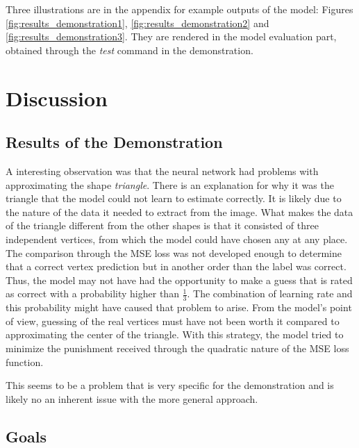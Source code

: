 \documentclass[12pt, a4paper, titlepage]{report}
\begin{document}
Three illustrations are in the appendix for example outputs of the model: Figures \ref{fig:results_demonstration1}, \ref{fig:results_demonstration2} and \ref{fig:results_demonstration3}.
They are rendered in the model evaluation part, obtained through the \emph{test} command in the demonstration.





\chapter{Discussion}

\section{Results of the Demonstration}

A interesting observation was that the neural network had problems with approximating the shape \emph{triangle}.
There is an explanation for why it was the triangle that the model could not learn to estimate correctly. It is likely due to the nature of the data it needed to extract from the image. What makes the data of the triangle different from the other shapes is that it consisted of three independent vertices, from which the model could have chosen any at any place. The comparison through the MSE loss was not developed enough to determine that a correct vertex prediction but in another order than the label was correct. Thus, the model may not have had the opportunity to make a guess that is rated as correct with a probability higher than $\frac{1}{3}$. The combination of learning rate and this probability might have caused that problem to arise. From the model's point of view, guessing of the real vertices must have not been worth it compared to approximating the center of the triangle. With this strategy, the model tried to minimize the punishment received through the quadratic nature of the MSE loss function.

This seems to be a problem that is very specific for the demonstration and is likely no an inherent issue with the more general approach.

\section{Goals}
\end{document}
